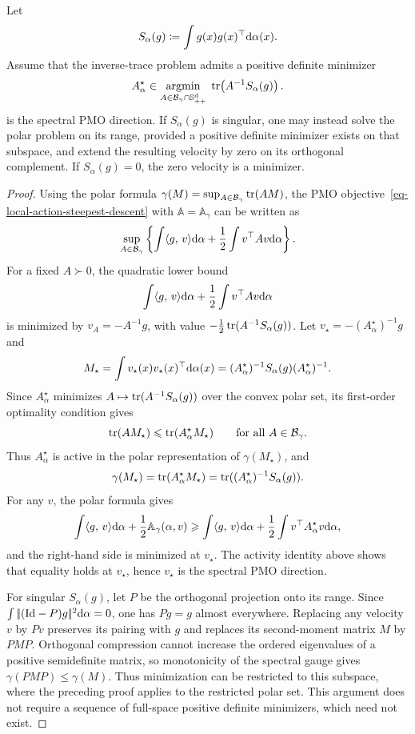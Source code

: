 \begin{prop}\label{prop-normalized-spectral-polar}
	Let
	\[
		S_\alpha(g)\coloneqq\int g(x)g(x)^\top\mathrm{d}\alpha(x).
	\]
	Assume that the inverse-trace problem admits a positive definite minimizer
	\[
		A_\alpha^\star
		\in
		\underset{A\in\mathcal B_\gamma\cap\mathbb S_{++}^d}{\operatorname{argmin}}\;
		\operatorname{tr}\!\left(A^{-1}S_\alpha(g)\right).
	\]
	is the spectral PMO direction. If $S_\alpha(g)$ is singular, one may instead solve the polar problem on its range, provided a positive definite minimizer exists on that subspace, and extend the resulting velocity by zero on its orthogonal complement. If $S_\alpha(g)=0$, the zero velocity is a minimizer.
\end{prop}
\begin{proof}
	Using the polar formula $\gamma(M)=\sup_{A\in\mathcal B_\gamma}\operatorname{tr}(AM)$, the PMO objective~\eqref{eq-local-action-steepest-descent} with \(\mathbb A=\mathbb A_\gamma\) can be written as
	\[
		\sup_{A\in\mathcal B_\gamma}
		\left\{
		\int \langle g,\,v\rangle\mathrm{d}\alpha
		+
		\frac12\int v^\top A v\mathrm{d}\alpha
		\right\}.
	\]
	For a fixed $A\succ0$, the quadratic lower bound
	\[
		\int \langle g,\,v\rangle\mathrm{d}\alpha+\frac12\int v^\top A v\mathrm{d}\alpha
	\]
	is minimized by $v_A=-A^{-1}g$, with value $-\frac12\operatorname{tr}(A^{-1}S_\alpha(g))$. Let $v_\star=-(A_\alpha^\star)^{-1}g$ and
	\[
		M_\star=\int v_\star(x)v_\star(x)^\top\mathrm{d}\alpha(x)
		=
		(A_\alpha^\star)^{-1}S_\alpha(g)(A_\alpha^\star)^{-1}.
	\]
	Since $A_\alpha^\star$ minimizes $A\mapsto\operatorname{tr}(A^{-1}S_\alpha(g))$ over the convex polar set, its first-order optimality condition gives
	\[
		\operatorname{tr}(AM_\star)\leqslant \operatorname{tr}(A_\alpha^\star M_\star)
		\qquad
		\text{for all } A\in\mathcal B_\gamma.
	\]
	Thus $A_\alpha^\star$ is active in the polar representation of $\gamma(M_\star)$, and
	\[
		\gamma(M_\star)=\operatorname{tr}(A_\alpha^\star M_\star)
		=
		\operatorname{tr}((A_\alpha^\star)^{-1}S_\alpha(g)).
	\]
	For any $v$, the polar formula gives
	\[
		\int \langle g,\,v\rangle\mathrm{d}\alpha+\frac12\mathbb A_\gamma(\alpha,v)
		\geqslant
		\int \langle g,\,v\rangle\mathrm{d}\alpha+\frac12\int v^\top A_\alpha^\star v\mathrm{d}\alpha,
	\]
	and the right-hand side is minimized at $v_\star$. The activity identity above shows that equality holds at $v_\star$, hence $v_\star$ is the spectral PMO direction.

	For singular $S_\alpha(g)$, let $P$ be the orthogonal projection onto its range. Since $\int|\!| (\mathrm{Id}-P)g |\!|^2\mathrm{d}\alpha=0$, one has $Pg=g$ almost everywhere. Replacing any velocity $v$ by $Pv$ preserves its pairing with $g$ and replaces its second-moment matrix $M$ by $PMP$. Orthogonal compression cannot increase the ordered eigenvalues of a positive semidefinite matrix, so monotonicity of the spectral gauge gives $\gamma(PMP)\leq\gamma(M)$. Thus minimization can be restricted to this subspace, where the preceding proof applies to the restricted polar set. This argument does not require a sequence of full-space positive definite minimizers, which need not exist.
\end{proof}

